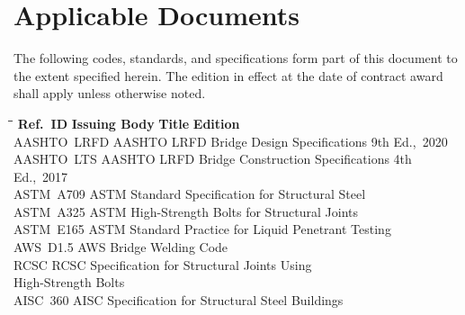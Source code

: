 \section{Applicable Documents}

The following codes, standards, and specifications form part of this document to the extent
specified herein. The edition in effect at the date of contract award shall apply unless
otherwise noted.

\begin{tabbing}
  \hspace*{14mm}\=\hspace*{24mm}\=\hspace*{68mm}\=\kill
  \textbf{\small Ref.\ ID}\> \textbf{\small Issuing Body}\> \textbf{\small Title}\> \textbf{\small Edition}\\[2pt]
  AASHTO\ LRFD\> AASHTO\> LRFD Bridge Design Specifications\> 9th Ed.,\ 2020\\
  AASHTO\ LTS\> AASHTO\> LRFD Bridge Construction Specifications\> 4th Ed.,\ 2017\\
  ASTM\ A709\> ASTM\> Standard Specification for Structural Steel\\
  ASTM\ A325\> ASTM\> High-Strength Bolts for Structural Joints\\
  ASTM\ E165\> ASTM\> Standard Practice for Liquid Penetrant Testing\\
  AWS\ D1.5\> AWS\> Bridge Welding Code\\
  RCSC\> RCSC\> Specification for Structural Joints Using\\ \> \> High-Strength Bolts\\
  AISC\ 360\> AISC\> Specification for Structural Steel Buildings
\end{tabbing}

